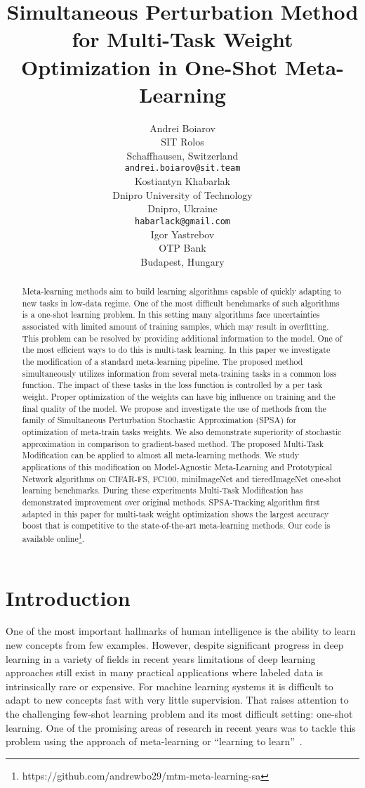 \documentclass{article}
\title{Simultaneous Perturbation Method for Multi-Task Weight Optimization in One-Shot Meta-Learning}
\author{{Andrei Boiarov} \\
	SIT Rolos\\
	Schaffhausen, Switzerland \\
	\texttt{andrei.boiarov@sit.team} \\
\And
	{Kostiantyn Khabarlak} \\
	Dnipro University of Technology\\
	Dnipro, Ukraine\\
	\texttt{habarlack@gmail.com} \\
	\And
	{Igor Yastrebov} \\
	OTP Bank\\
	Budapest, Hungary\\
}
\date{}
\begin{document}
\maketitle

\begin{abstract}
	Meta-learning methods aim to build learning algorithms capable of quickly adapting to new tasks in low-data regime. One of the most difficult benchmarks of such algorithms is a one-shot learning problem. In this setting many algorithms face uncertainties associated with limited amount of training samples, which may result in overfitting. This problem can be resolved by providing additional information to the model. One of the most efficient ways to do this is multi-task learning. In this paper we investigate the modification of a standard meta-learning pipeline. The proposed method simultaneously utilizes information from several meta-training tasks in a common loss function. The impact of these tasks in the loss function is controlled by a per task weight. Proper optimization of the weights can have big influence on training and the final quality of the model. We propose and investigate the use of methods from the family of Simultaneous Perturbation Stochastic Approximation (SPSA) for optimization of meta-train tasks weights. We also demonstrate superiority of stochastic approximation in comparison to gradient-based method. The proposed Multi-Task Modification can be applied to almost all meta-learning methods. We study applications of this modification on Model-Agnostic Meta-Learning and Prototypical Network algorithms on CIFAR-FS, FC100, miniImageNet and tieredImageNet one-shot learning benchmarks. During these experiments Multi-Task Modification has demonstrated improvement over original methods. SPSA-Tracking algorithm first adapted in this paper for multi-task weight optimization shows the largest accuracy boost that is competitive to the state-of-the-art meta-learning methods. Our code is available online\footnote[1]{https://github.com/andrewbo29/mtm-meta-learning-sa}.
\end{abstract}




\section{Introduction}

One of the most important hallmarks of human intelligence is the ability to learn new concepts from few examples. However, despite significant progress in deep learning in a variety of fields in recent years limitations of deep learning approaches still exist in many practical applications where labeled data is intrinsically rare or expensive. For machine learning systems it is difficult to adapt to new concepts fast with very little supervision. That raises attention to the challenging few-shot learning problem and its most difficult setting: one-shot learning. One of the promising areas of research in recent years was to tackle this problem using the approach of meta-learning or ``learning to learn''~\cite{finn2017model,8954109,rusu2018meta}.
\end{document}
